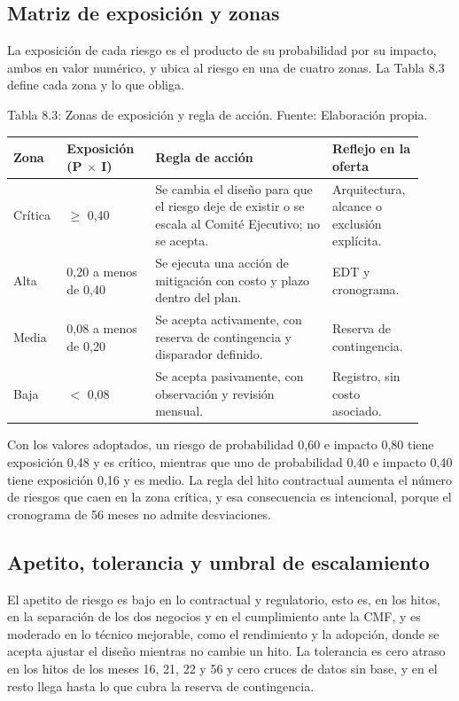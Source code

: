 \documentclass[11pt]{article}
\begin{document}
\subsection{Matriz de exposición y zonas}

La exposición de cada riesgo es el producto de su probabilidad por su impacto, ambos en valor numérico, y ubica al riesgo en una de cuatro zonas. La Tabla 8.3 define cada zona y lo que obliga.

Tabla 8.3: Zonas de exposición y regla de acción. Fuente: Elaboración propia.\label{tab:8-3}

\begin{longtable}{p{0.12\linewidth}p{0.20\linewidth}p{0.40\linewidth}p{0.20\linewidth}}
\toprule
\textbf{Zona} & \textbf{Exposición (P $\times$ I)} & \textbf{Regla de acción} & \textbf{Reflejo en la oferta} \\
\midrule
\endhead
\bottomrule
\endlastfoot
Crítica & $\geq$ 0,40 & Se cambia el diseño para que el riesgo deje de existir o se escala al Comité Ejecutivo; no se acepta. & Arquitectura, alcance o exclusión explícita. \\
Alta & 0,20 a menos de 0,40 & Se ejecuta una acción de mitigación con costo y plazo dentro del plan. & EDT y cronograma. \\
Media & 0,08 a menos de 0,20 & Se acepta activamente, con reserva de contingencia y disparador definido. & Reserva de contingencia. \\
Baja & $<$ 0,08 & Se acepta pasivamente, con observación y revisión mensual. & Registro, sin costo asociado. \\
\end{longtable}

Con los valores adoptados, un riesgo de probabilidad 0,60 e impacto 0,80 tiene exposición 0,48 y es crítico, mientras que uno de probabilidad 0,40 e impacto 0,40 tiene exposición 0,16 y es medio. La regla del hito contractual aumenta el número de riesgos que caen en la zona crítica, y esa consecuencia es intencional, porque el cronograma de 56 meses no admite desviaciones.

\subsection{Apetito, tolerancia y umbral de escalamiento}

El apetito de riesgo es bajo en lo contractual y regulatorio, esto es, en los hitos, en la separación de los dos negocios y en el cumplimiento ante la CMF, y es moderado en lo técnico mejorable, como el rendimiento y la adopción, donde se acepta ajustar el diseño mientras no cambie un hito. La tolerancia es cero atraso en los hitos de los meses 16, 21, 22 y 56 y cero cruces de datos sin base, y en el resto llega hasta lo que cubra la reserva de contingencia.
\end{document}
